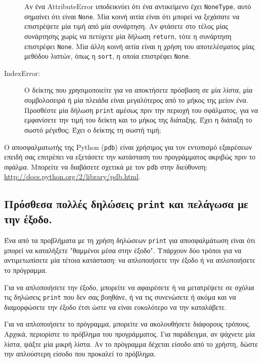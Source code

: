 \documentclass[10pt]{book}
\begin{document}
\begin{description}
Αν ένα AttributeError υποδεικνύει ότι ένα αντικείμενο έχει {\tt NoneType}, αυτό σημαίνει ότι είναι  {\tt None}.
Μία κοινή αιτία είναι ότι μπορεί να ξεχάσατε να επιστρέψετε μία τιμή από μία συνάρτηση. Αν φτάσετε στο
τέλος μίας συνάρτησης χωρίς να πετύχετε μία δήλωση {\tt return}, τότε η συνάρτηση επιστρέφει {\tt None}.
Μία άλλη κοινή αιτία είναι η χρήση του αποτελέσματος μίας μεθόδου λιστών, όπως η {\tt sort}, η οποία επιστρέφει 
{\tt None}.

\item[IndexError:]  Ο δείκτης που χρησιμοποιείτε για να αποκτήσετε πρόσβαση σε μία λίστα, μία συμβολοσειρά ή μία
πλειάδα είναι μεγαλύτερος από το μήκος της μείον ένα.  Προσθέστε μία δήλωση {\tt print} αμέσως πριν την περιοχή του
σφάλματος, για να εμφανίσετε την τιμή του δείκτη και το μήκος της διάταξης.  Έχει η διάταξη το σωστό μέγεθος;
Έχει ο δείκτης τη σωστή τιμή;

\end{description}

Ο αποσφαλματωτής της Python ({\tt pdb}) είναι χρήσιμος για τον εντοπισμό εξαιρέσεων επειδή σας επιτρέπει να εξετάσετε
την κατάσταση του προγράμματος ακριβώς πριν το σφάλμα.  Μπορείτε να διαβάσετε σχετικά με τον {\tt pdb} στην διεύθυνση:
\url{http://docs.python.org/2/library/pdb.html}. 


\subsection{Πρόσθεσα πολλές δηλώσεις {\tt print} και πελάγωσα με την έξοδο.}

Ένα από τα προβλήματα με τη χρήση δηλώσεων {\tt print} για αποσφαλμάτωση είναι ότι μπορεί να καταλήξετε "θαμμένοι μέσα στην έξοδο". Υπάρχουν δύο τρόποι για να αντιμετωπίσετε μία τέτοια κατάσταση: να απλοποιήσετε την έξοδο ή να απλοποιήσετε το πρόγραμμα.

Για να απλοποιήσετε την έξοδο, μπορείτε να αφαιρέσετε ή να μετατρέψετε σε σχόλια τις δηλώσεις {\tt print} που δεν σας βοηθάνε,
ή να τις συνενώσετε ή ακόμα και να διαμορφώσετε την έξοδο έτσι ώστε να είναι ευκολότερο να την καταλάβετε.

Για να απλοποιήσετε το πρόγραμμα, μπορείτε να ακολουθήσετε διάφορους τρόπους. Αρχικά, περιορίστε το πρόβλημα του προγράμματος.
Για παράδειγμα, αν ψάχνετε μία λίστα, ψάξτε μία μικρή λίστα.  Αν το πρόγραμμα δέχεται είσοδο από το χρήστη, δώστε την
απλούστερη είσοδο που προκαλεί το πρόβλημα.
\end{document}
